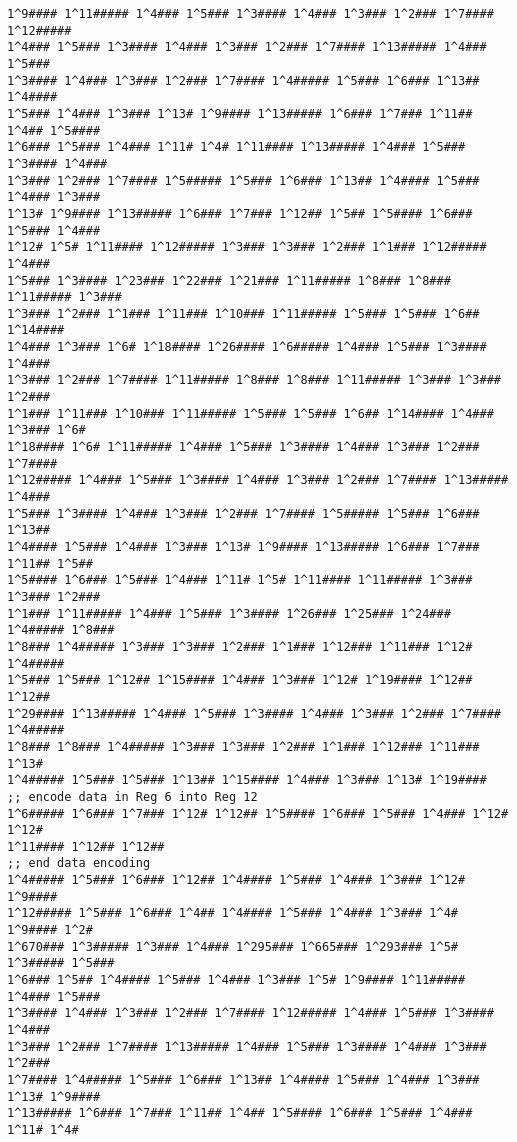 \begin{@twocolumnfalse}
\begin{lstlisting}
1^9#### 1^11##### 1^4### 1^5### 1^3#### 1^4### 1^3### 1^2### 1^7#### 1^12#####
1^4### 1^5### 1^3#### 1^4### 1^3### 1^2### 1^7#### 1^13##### 1^4### 1^5###
1^3#### 1^4### 1^3### 1^2### 1^7#### 1^4##### 1^5### 1^6### 1^13## 1^4####
1^5### 1^4### 1^3### 1^13# 1^9#### 1^13##### 1^6### 1^7### 1^11## 1^4## 1^5####
1^6### 1^5### 1^4### 1^11# 1^4# 1^11#### 1^13##### 1^4### 1^5### 1^3#### 1^4###
1^3### 1^2### 1^7#### 1^5##### 1^5### 1^6### 1^13## 1^4#### 1^5### 1^4### 1^3###
1^13# 1^9#### 1^13##### 1^6### 1^7### 1^12## 1^5## 1^5#### 1^6### 1^5### 1^4###
1^12# 1^5# 1^11#### 1^12##### 1^3### 1^3### 1^2### 1^1### 1^12##### 1^4###
1^5### 1^3#### 1^23### 1^22### 1^21### 1^11##### 1^8### 1^8### 1^11##### 1^3###
1^3### 1^2### 1^1### 1^11### 1^10### 1^11##### 1^5### 1^5### 1^6## 1^14####
1^4### 1^3### 1^6# 1^18#### 1^26#### 1^6##### 1^4### 1^5### 1^3#### 1^4###
1^3### 1^2### 1^7#### 1^11##### 1^8### 1^8### 1^11##### 1^3### 1^3### 1^2###
1^1### 1^11### 1^10### 1^11##### 1^5### 1^5### 1^6## 1^14#### 1^4### 1^3### 1^6#
1^18#### 1^6# 1^11##### 1^4### 1^5### 1^3#### 1^4### 1^3### 1^2### 1^7####
1^12##### 1^4### 1^5### 1^3#### 1^4### 1^3### 1^2### 1^7#### 1^13##### 1^4###
1^5### 1^3#### 1^4### 1^3### 1^2### 1^7#### 1^5##### 1^5### 1^6### 1^13##
1^4#### 1^5### 1^4### 1^3### 1^13# 1^9#### 1^13##### 1^6### 1^7### 1^11## 1^5##
1^5#### 1^6### 1^5### 1^4### 1^11# 1^5# 1^11#### 1^11##### 1^3### 1^3### 1^2###
1^1### 1^11##### 1^4### 1^5### 1^3#### 1^26### 1^25### 1^24### 1^4##### 1^8###
1^8### 1^4##### 1^3### 1^3### 1^2### 1^1### 1^12### 1^11### 1^12# 1^4#####
1^5### 1^5### 1^12## 1^15#### 1^4### 1^3### 1^12# 1^19#### 1^12## 1^12##
1^29#### 1^13##### 1^4### 1^5### 1^3#### 1^4### 1^3### 1^2### 1^7#### 1^4#####
1^8### 1^8### 1^4##### 1^3### 1^3### 1^2### 1^1### 1^12### 1^11### 1^13#
1^4##### 1^5### 1^5### 1^13## 1^15#### 1^4### 1^3### 1^13# 1^19####
;; encode data in Reg 6 into Reg 12
1^6##### 1^6### 1^7### 1^12# 1^12## 1^5#### 1^6### 1^5### 1^4### 1^12# 1^12#
1^11#### 1^12## 1^12##
;; end data encoding
1^4##### 1^5### 1^6### 1^12## 1^4#### 1^5### 1^4### 1^3### 1^12# 1^9####
1^12##### 1^5### 1^6### 1^4## 1^4#### 1^5### 1^4### 1^3### 1^4# 1^9#### 1^2#
1^670### 1^3##### 1^3### 1^4### 1^295### 1^665### 1^293### 1^5# 1^3##### 1^5###
1^6### 1^5## 1^4#### 1^5### 1^4### 1^3### 1^5# 1^9#### 1^11##### 1^4### 1^5###
1^3#### 1^4### 1^3### 1^2### 1^7#### 1^12##### 1^4### 1^5### 1^3#### 1^4###
1^3### 1^2### 1^7#### 1^13##### 1^4### 1^5### 1^3#### 1^4### 1^3### 1^2###
1^7#### 1^4##### 1^5### 1^6### 1^13## 1^4#### 1^5### 1^4### 1^3### 1^13# 1^9####
1^13##### 1^6### 1^7### 1^11## 1^4## 1^5#### 1^6### 1^5### 1^4### 1^11# 1^4#

\end{lstlisting}
\end{@twocolumnfalse}
